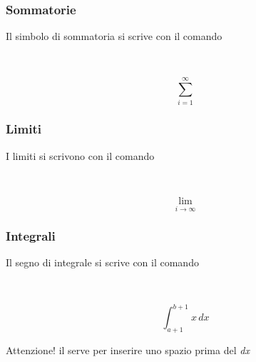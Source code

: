 \begin{frame}
  \frametitle{Sommatorie}
	Il simbolo di sommatoria si scrive con il comando 
 	\begin{LaTeXcode}
		\\[\n
		\hspace*{5ex}\alert{\\sum}\_\{i=1\}\textasciicircum \{\\infty\}\n
		\\]
 	\end{LaTeXcode}
	\begin{LaTeXoutput}
		\[
			\sum_{i=1}^{\infty}
		\]
	\end{LaTeXoutput}
\end{frame}
\begin{frame}
  \frametitle{Limiti}
	I limiti si scrivono con il comando 
 	\begin{LaTeXcode}
		\\[\n
		\hspace*{5ex}\alert{\\lim}\_\{i \\to \\infty\}\n
		\\]
 	\end{LaTeXcode}
	\begin{LaTeXoutput}
		\[
			\lim_{i \to \infty}
		\]
	\end{LaTeXoutput}
\end{frame}
\begin{frame}
  \frametitle{Integrali}
	Il segno di integrale si scrive con il comando \\
 	\begin{LaTeXcode}
		\\[\n
		\hspace*{5ex}\alert{\\int}\_\{a+1\}\textasciicircum \{b+1\}x\bs,dx\n
		\\]
 	\end{LaTeXcode}
	\begin{LaTeXoutput}
		\[
			\int_{a+1}^{b+1}x\,dx
		\]
	\end{LaTeXoutput}
	\begin{block}{Attenzione!}
	il \LCmd{,} serve per inserire uno spazio prima del \textrm{\textit{dx}}
	\end{block}
\end{frame}
